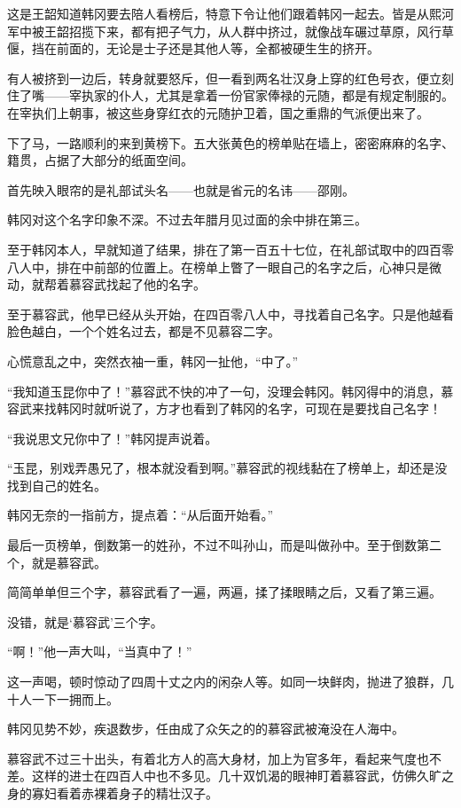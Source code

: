 这是王韶知道韩冈要去陪人看榜后，特意下令让他们跟着韩冈一起去。皆是从熙河军中被王韶招揽下来，都有把子气力，从人群中挤过，就像战车碾过草原，风行草偃，挡在前面的，无论是士子还是其他人等，全都被硬生生的挤开。

有人被挤到一边后，转身就要怒斥，但一看到两名壮汉身上穿的红色号衣，便立刻住了嘴——宰执家的仆人，尤其是拿着一份官家俸禄的元随，都是有规定制服的。在宰执们上朝事，被这些身穿红衣的元随护卫着，国之重鼎的气派便出来了。

下了马，一路顺利的来到黄榜下。五大张黄色的榜单贴在墙上，密密麻麻的名字、籍贯，占据了大部分的纸面空间。

首先映入眼帘的是礼部试头名——也就是省元的名讳——邵刚。

韩冈对这个名字印象不深。不过去年腊月见过面的余中排在第三。

至于韩冈本人，早就知道了结果，排在了第一百五十七位，在礼部试取中的四百零八人中，排在中前部的位置上。在榜单上瞥了一眼自己的名字之后，心神只是微动，就帮着慕容武找起了他的名字。

至于慕容武，他早已经从头开始，在四百零八人中，寻找着自己名字。只是他越看脸色越白，一个个姓名过去，都是不见慕容二字。

心慌意乱之中，突然衣袖一重，韩冈一扯他，“中了。”

“我知道玉昆你中了！”慕容武不快的冲了一句，没理会韩冈。韩冈得中的消息，慕容武来找韩冈时就听说了，方才也看到了韩冈的名字，可现在是要找自己名字！

“我说思文兄你中了！”韩冈提声说着。

“玉昆，别戏弄愚兄了，根本就没看到啊。”慕容武的视线黏在了榜单上，却还是没找到自己的姓名。

韩冈无奈的一指前方，提点着：“从后面开始看。”

最后一页榜单，倒数第一的姓孙，不过不叫孙山，而是叫做孙中。至于倒数第二个，就是慕容武。

简简单单但三个字，慕容武看了一遍，两遍，揉了揉眼睛之后，又看了第三遍。

没错，就是‘慕容武’三个字。

“啊！”他一声大叫，“当真中了！”

这一声喝，顿时惊动了四周十丈之内的闲杂人等。如同一块鲜肉，抛进了狼群，几十人一下一拥而上。

韩冈见势不妙，疾退数步，任由成了众矢之的的慕容武被淹没在人海中。

慕容武不过三十出头，有着北方人的高大身材，加上为官多年，看起来气度也不差。这样的进士在四百人中也不多见。几十双饥渴的眼神盯着慕容武，仿佛久旷之身的寡妇看着赤裸着身子的精壮汉子。

